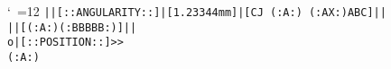 \documentclass[12pt, a4paper]{scrreprt}
\begin{document}
{\catcode`\ =12
\texttt{||[::ANGULARITY::]|[1.23344mm]|[CJ (:A:) (:AX:)ABC]||}\\[0.5cm]
%
\texttt{||[(:A:)(:BBBBB:)]||}\\[0.5cm]
%
\texttt{o|[::POSITION::]>>}\\[0.5cm]
%
\texttt{(:A:)}\\[0.5cm]
}
\end{document}

